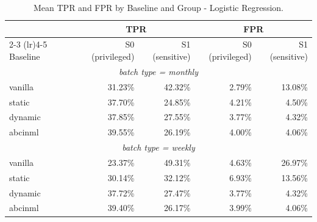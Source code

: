 \begin{table}
  \caption{Mean TPR and FPR by Baseline and Group - Logistic Regression.}
  \label{tab:absolute-rates-lr}
  \begin{tabular}{lrrrr}
    \toprule
     & \multicolumn{2}{c}{TPR} & \multicolumn{2}{c}{FPR} \\
    \cmidrule(lr){2-3} \cmidrule(lr){4-5}
    Baseline & S0 (privileged) & S1 (sensitive) & S0 (privileged) & S1 (sensitive) \\
    \midrule
    \multicolumn{5}{c}{\textit{batch type = monthly}} \\
    \midrule
    vanilla & 31.23\% & 42.32\% & 2.79\% & 13.08\% \\
    static & 37.70\% & 24.85\% & 4.21\% & 4.50\% \\
    dynamic & 37.85\% & 27.55\% & 3.77\% & 4.32\% \\
    abcinml & 39.55\% & 26.19\% & 4.00\% & 4.06\% \\
    \midrule
    \multicolumn{5}{c}{\textit{batch type = weekly}} \\
    \midrule
    vanilla & 23.37\% & 49.31\% & 4.63\% & 26.97\% \\
    static & 30.14\% & 32.12\% & 6.93\% & 13.56\% \\
    dynamic & 37.72\% & 27.47\% & 3.77\% & 4.32\% \\
    abcinml & 39.40\% & 26.17\% & 3.99\% & 4.06\% \\
    \bottomrule
  \end{tabular}
\end{table}
